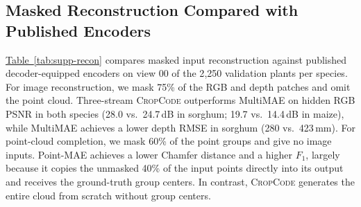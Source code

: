 \documentclass[10pt,twocolumn,letterpaper]{article}
\newcommand{\tabref}[1]{\hyperref[#1]{Table~\ref*{#1}}}
\newcommand{\method}{\textup{\textsc{CropCode}}}   %
\begin{document}
\subsection{Masked Reconstruction Compared with Published Encoders}
\label{sec:supp-recon}

\tabref{tab:supp-recon} compares masked input reconstruction against published decoder-equipped encoders on view 00 of the 2{,}250 validation plants per species. For image reconstruction, we mask 75\% of the RGB and depth patches and omit the point cloud. Three-stream \method{} outperforms MultiMAE on hidden RGB PSNR in both species (28.0 vs.\ 24.7\,dB in sorghum; 19.7 vs.\ 14.4\,dB in maize), while MultiMAE achieves a lower depth RMSE in sorghum (280 vs.\ 423\,mm). For point-cloud completion, we mask 60\% of the point groups and give no image inputs. Point-MAE achieves a lower Chamfer distance and a higher $F_1$, largely because it copies the unmasked 40\% of the input points directly into its output and receives the ground-truth group centers. In contrast, \method{} generates the entire cloud from scratch without group centers.
\end{document}
